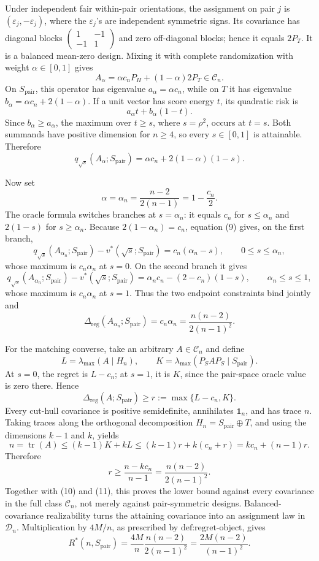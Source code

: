Under independent fair within-pair orientations, the assignment on pair \(j\) is \((\varepsilon_j,-\varepsilon_j)\), where the \(\varepsilon_j\)'s are independent symmetric signs.  Its covariance has diagonal blocks
\(\begin{pmatrix}1&-1\\-1&1\end{pmatrix}\) and zero off-diagonal blocks; hence it equals \(2P_T\).  It is a balanced mean-zero design.  Mixing it with complete randomization with weight \(\alpha\in[0,1]\) gives
\[
 A_\alpha=\alpha c_nP_H+(1-\alpha)2P_T\in\mathcal C_n.
\]
On \(S_{\mathrm{pair}}\), this operator has eigenvalue \(a_\alpha=\alpha c_n\), while on \(T\) it has eigenvalue
\(b_\alpha=\alpha c_n+2(1-\alpha)\).  If a unit vector has score energy \(t\), its quadratic risk is
\[
 a_\alpha t+b_\alpha(1-t).
\]
Since \(b_\alpha\geq a_\alpha\), the maximum over \(t\geq s\), where \(s=\rho^2\), occurs at \(t=s\).  Both summands have positive dimension for \(n\geq4\), so every \(s\in[0,1]\) is attainable.  Therefore
\[
 q_{\sqrt{s}}(A_\alpha;S_{\mathrm{pair}})
 =\alpha c_n+2(1-\alpha)(1-s).
 \tag{9}
\]

Now set
\[
 \alpha=\alpha_n=\frac{n-2}{2(n-1)}
 =1-\frac{c_n}{2}.
\]
The oracle formula switches branches at \(s=\alpha_n\): it equals \(c_n\) for \(s\leq\alpha_n\) and \(2(1-s)\) for \(s\geq\alpha_n\).  Because \(2(1-\alpha_n)=c_n\), equation (9) gives, on the first branch,
\[
 q_{\sqrt{s}}(A_{\alpha_n};S_{\mathrm{pair}})-v^*(\sqrt{s};S_{\mathrm{pair}})
 =c_n(\alpha_n-s),
 \qquad 0\leq s\leq\alpha_n,
\]
whose maximum is \(c_n\alpha_n\) at \(s=0\).  On the second branch it gives
\[
 q_{\sqrt{s}}(A_{\alpha_n};S_{\mathrm{pair}})-v^*(\sqrt{s};S_{\mathrm{pair}})
 =\alpha_nc_n-(2-c_n)(1-s),
 \qquad \alpha_n\leq s\leq1,
\]
whose maximum is \(c_n\alpha_n\) at \(s=1\).  Thus the two endpoint constraints bind jointly and
\[
 \Delta_{\mathrm{reg}}(A_{\alpha_n};S_{\mathrm{pair}})
 =c_n\alpha_n
 =\frac{n(n-2)}{2(n-1)^2}.
 \tag{10}
\]

For the matching converse, take an arbitrary \(A\in\mathcal C_n\) and define
\[
 L=\lambda_{\max}(A\mid H_n),
 \qquad K=\lambda_{\max}(P_SAP_S\mid S_{\mathrm{pair}}).
\]
At \(s=0\), the regret is \(L-c_n\); at \(s=1\), it is \(K\), since the pair-space oracle value is zero there.  Hence
\[
 \Delta_{\mathrm{reg}}(A;S_{\mathrm{pair}})
 \geq r:=\max\{L-c_n,K\}.
 \tag{11}
\]
Every cut-hull covariance is positive semidefinite, annihilates \(\mathbf1_n\), and has trace \(n\).  Taking traces along the orthogonal decomposition \(H_n=S_{\mathrm{pair}}\oplus T\), and using the dimensions \(k-1\) and \(k\), yields
\[
 n=\operatorname{tr}(A)
 \leq(k-1)K+kL
 \leq(k-1)r+k(c_n+r)
 =kc_n+(n-1)r.
\]
Therefore
\[
 r\geq\frac{n-kc_n}{n-1}
 =\frac{n(n-2)}{2(n-1)^2}.
\]
Together with (10) and (11), this proves the lower bound against every covariance in the full class \(\mathcal C_n\), not merely against pair-symmetric designs.  Balanced-covariance realizability turns the attaining covariance into an assignment law in \(\mathcal D_n\).  Multiplication by \(4M/n\), as prescribed by \(\text{def:regret-object}\), gives
\[
 R^*(n,S_{\mathrm{pair}})
 =\frac{4M}{n}\frac{n(n-2)}{2(n-1)^2}
 =\frac{2M(n-2)}{(n-1)^2}.
\]


